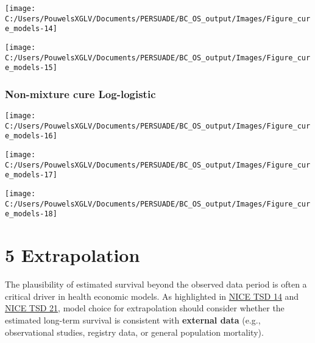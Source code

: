 \documentclass[
]{article}
\begin{document}
\begin{flushleft}\texttt{[image: C:/Users/PouwelsXGLV/Documents/PERSUADE/BC\_OS\_output/Images/Figure\_cure\_models-14]} \end{flushleft}

\begin{flushleft}\texttt{[image: C:/Users/PouwelsXGLV/Documents/PERSUADE/BC\_OS\_output/Images/Figure\_cure\_models-15]} \end{flushleft}

\clearpage

\subsubsection{Non-mixture cure
Log-logistic}\label{non-mixture-cure-log-logistic}

\begin{flushleft}\texttt{[image: C:/Users/PouwelsXGLV/Documents/PERSUADE/BC\_OS\_output/Images/Figure\_cure\_models-16]} \end{flushleft}

\begin{flushleft}\texttt{[image: C:/Users/PouwelsXGLV/Documents/PERSUADE/BC\_OS\_output/Images/Figure\_cure\_models-17]} \end{flushleft}

\begin{flushleft}\texttt{[image: C:/Users/PouwelsXGLV/Documents/PERSUADE/BC\_OS\_output/Images/Figure\_cure\_models-18]} \end{flushleft}

\clearpage

\section{5 Extrapolation}\label{extrapolation}

The plausibility of estimated survival beyond the observed data period
is often a critical driver in health economic models. As highlighted in
\href{https://nicedsu.org.uk/wp-content/uploads/2016/03/NICE-DSU-TSD-Survival-analysis.updated-March-2013.v2.pdf}{NICE
TSD 14} and \href{https://www.sheffield.ac.uk/media/34188/download}{NICE
TSD 21}, model choice for extrapolation should consider whether the
estimated long-term survival is consistent with \textbf{external data}
(e.g., observational studies, registry data, or general population
mortality).
\end{document}
